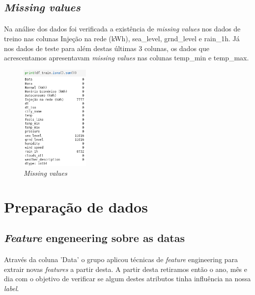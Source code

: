 \subsection{\textit{Missing values}}
\paragraph{}
Na análise dos dados foi verificada a existência de \textit{missing values} nos dados de treino nas colunas Injeção na rede (kWh), sea\_level, grnd\_level e rain\_1h. Já nos dados de teste para além destas últimas 3 colunas, os dados que acrescentamos apresentavam \textit{missing values} nas colunas temp\_min e temp\_max.

\begin{figure}[H]
    \centering
    \centerline{\includegraphics[width=0.3\textwidth]{Imagens/Competição/missing_values.png}}
    \caption{\textit{Missing values}}
    \label{fig: missing_values}
\end{figure}


\section{Preparação de dados}

\subsection{\textit{Feature} engeneering sobre as datas}
\paragraph{}
Através da coluna 'Data' o grupo aplicou técnicas de \textit{feature} engineering para extrair novas \textit{features} a partir desta. A partir desta retiramos então o ano, mês e dia com o objetivo de verificar se algum destes atributos tinha influência na nossa \textit{label}.

